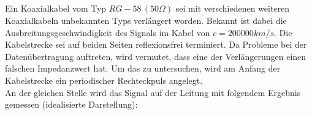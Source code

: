 \documentclass[a4paper]{article}
\begin{document}
\subsection{}
Ein Koaxialkabel vom Typ $RG-58\,(50 \Omega)$ sei mit verschiedenen weiteren Koaxialkabeln unbekannten Typs verlängert worden. Bekannt ist dabei die Ausbreitungsgeschwindigkeit des Signals im Kabel von $c = 200 000 km/s$. Die Kabelstrecke sei auf beiden Seiten reflexionsfrei terminiert. Da Probleme bei der Datenübertragung auftreten, wird vermutet, dass eine der Verlängerungen einen falschen Impedanzwert hat. Um das zu untersuchen, wird am Anfang der Kabelstrecke ein periodischer Rechteckpuls angelegt.\\
An der gleichen Stelle wird das Signal auf der Leitung mit folgendem Ergebnis gemessen (idealisierte Darstellung):
\begin{center}
\end{center}
\end{document}
